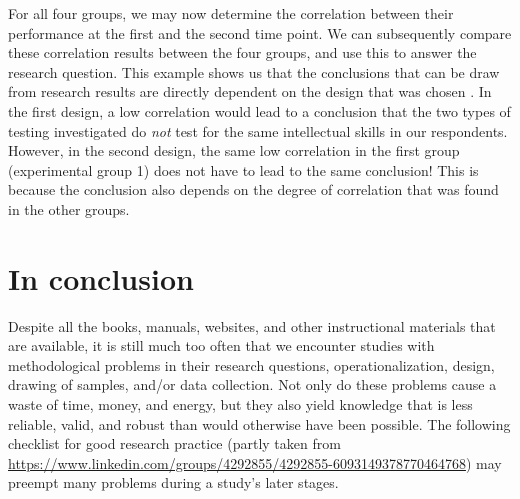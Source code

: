 \documentclass[
]{book}
\begin{document}
For all four groups, we may now determine the correlation between their performance at the first and the second time point. We can subsequently compare these correlation results between the four groups, and use this to answer the research question. This example shows us that the conclusions that can be draw from research results are directly dependent on the design that was chosen \citep{Levin99}. In the first design, a low correlation would lead to a conclusion that the two types of testing investigated do \emph{not} test for the same intellectual skills in our respondents. However, in the second design, the same low correlation in the first group (experimental group 1) does not have to lead to the same conclusion! This is because the conclusion also depends on the degree of correlation that was found in the other groups.

\hypertarget{in-conclusion}{%
\section{In conclusion}\label{in-conclusion}}

Despite all the books, manuals, websites, and other instructional materials that are available, it is still much too often that we encounter studies with methodological problems in their research questions, operationalization, design, drawing of samples, and/or data collection. Not only do these problems cause a waste of time, money, and energy, but they also yield knowledge that is less reliable, valid, and robust than would otherwise have been possible. The following checklist for good research practice (partly taken from \url{https://www.linkedin.com/groups/4292855/4292855-6093149378770464768}) may preempt many problems during a study's later stages.
\end{document}
